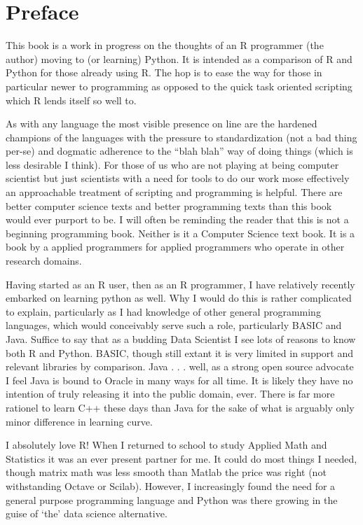\documentclass[]{book}
\theoremstyle{definition}
\theoremstyle{definition}
\theoremstyle{definition}
\theoremstyle{remark}
\begin{document}
\section{Preface}\label{preface}

This book is a work in progress on the thoughts of an R programmer (the
author) moving to (or learning) Python. It is intended as a comparison
of R and Python for those already using R. The hop is to ease the way
for those in particular newer to programming as opposed to the quick
task oriented scripting which R lends itself so well to.

As with any language the most visible presence on line are the hardened
champions of the languages with the pressure to standardization (not a
bad thing per-se) and dogmatic adherence to the ``blah blah'' way of
doing things (which is less desirable I think). For those of us who are
not playing at being computer scientist but just scientists with a need
for tools to do our work mose effectively an approachable treatment of
scripting and programming is helpful. There are better computer science
texts and better programming texts than this book would ever purport to
be. I will often be reminding the reader that this is not a beginning
programming book. Neither is it a Computer Science text book. It is a
book by a applied programmers for applied programmers who operate in
other research domains.

Having started as an R user, then as an R programmer, I have relatively
recently embarked on learning python as well. Why I would do this is
rather complicated to explain, particularly as I had knowledge of other
general programming languages, which would conceivably serve such a
role, particularly BASIC and Java. Suffice to say that as a budding Data
Scientist I see lots of reasons to know both R and Python. BASIC, though
still extant it is very limited in support and relevant libraries by
comparison. Java . . . well, as a strong open source advocate I feel
Java is bound to Oracle in many ways for all time. It is likely they
have no intention of truly releasing it into the public domain, ever.
There is far more rationel to learn C++ these days than Java for the
sake of what is arguably only minor difference in learning curve.

I absolutely love R! When I returned to school to study Applied Math and
Statistics it was an ever present partner for me. It could do most
things I needed, though matrix math was less smooth than Matlab the
price was right (not withstanding Octave or Scilab). However, I
increasingly found the need for a general purpose programming language
and Python was there growing in the guise of `the' data science
alternative.
\end{document}

